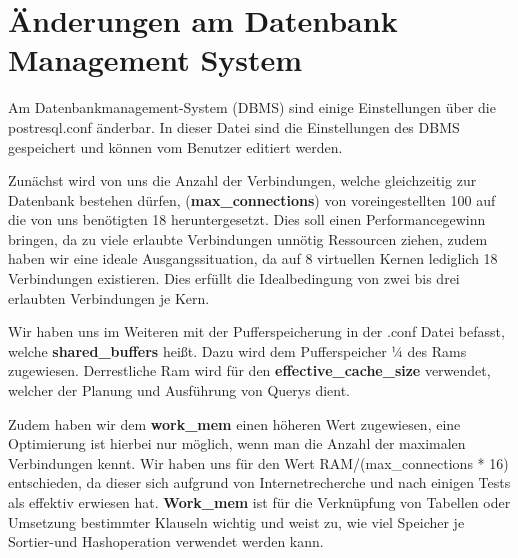 \section{Änderungen am Datenbank Management System}

Am Datenbankmanagement-System (DBMS) sind einige Einstellungen über die postresql.conf änderbar. In 
dieser Datei sind die Einstellungen des DBMS gespeichert und können vom Benutzer editiert werden. 

Zunächst wird von uns die Anzahl der Verbindungen, welche gleichzeitig zur Datenbank bestehen 
dürfen, (\textbf{max\_connections}) von voreingestellten 100 auf die von uns
benötigten 18 heruntergesetzt.
Dies soll einen Performancegewinn bringen, da zu viele erlaubte Verbindungen unnötig Ressourcen 
ziehen, zudem haben wir eine ideale Ausgangssituation, da auf 8 virtuellen Kernen lediglich 18 
Verbindungen existieren. Dies erfüllt die Idealbedingung von zwei bis drei erlaubten Verbindungen 
je Kern.

Wir haben uns im Weiteren mit der Pufferspeicherung in der .conf Datei befasst, welche 
\textbf{shared\_buffers} heißt. Dazu wird dem Pufferspeicher ¼ des Rams
zugewiesen.
Derrestliche Ram wird für den \textbf{effective\_cache\_size} verwendet, welcher
der Planung und Ausführung von Querys dient.

Zudem haben wir dem \textbf{work\_mem} einen höheren Wert zugewiesen, eine
Optimierung ist hierbei nur möglich, wenn man die Anzahl der maximalen Verbindungen kennt. Wir haben uns für den Wert 
RAM/(max\_connections * 16) entschieden, da dieser sich aufgrund von Internetrecherche und nach 
einigen Tests als effektiv erwiesen hat. \textbf{Work\_mem} ist für die
Verknüpfung von Tabellen oder Umsetzung bestimmter Klauseln wichtig und weist zu, wie viel Speicher je Sortier-und Hashoperation 
verwendet werden kann.



\clearpage